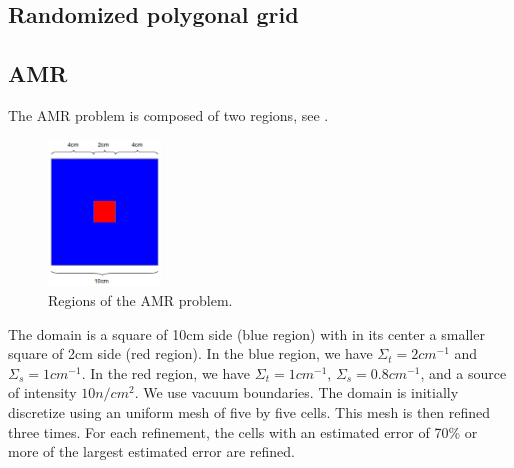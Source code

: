 \subsection{Randomized polygonal grid}
\subsection{AMR}
The AMR problem is composed of two regions, see .
\begin{figure}[H]
  \centering
  \includegraphics[width=3cm]{amr_zones}
  \caption{Regions of the AMR problem.}
  \label{amr_regions}
\end{figure}
The domain is a square of 10cm side (blue region) with in its center a smaller
square of 2cm side (red region). In the blue region, we have
$\Sigma_t=2cm^{-1}$ and $\Sigma_s=1cm^{-1}$. In the red region, we have
$\Sigma_t=1cm^{-1}$, $\Sigma_s=0.8cm^{-1}$, and a source of intensity $10
n/cm^{2}$. We use vacuum boundaries. The domain is initially discretize using
an uniform mesh of five by five cells. This mesh is then refined three
times. For each refinement, the cells with an estimated error of 70\% or more
of the largest estimated error are refined.
